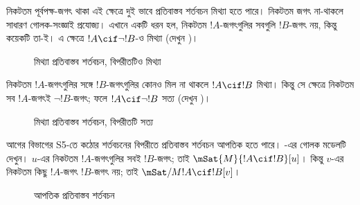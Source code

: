 \documentclass[../../../include/open-logic-section]{subfiles}
\begin{document}
নিকটতম পূর্বপক্ষ-জগৎ থাকা এই ক্ষেত্রে দুই ভাবে প্রতিবাস্তব
শর্তবচন মিথ্যা হতে পারে। নিকটতম জগৎ না-থাকলে সাধারণ
গোলক-সংজ্ঞাই প্রযোজ্য। এখানে একটি ধরন হল,
নিকটতম $!A$-জগৎগুলির সবগুলি $!B$-জগৎ নয়, কিন্তু কয়েকটি
তা-ই। এ ক্ষেত্রে $!A \cif \lnot !B$-ও মিথ্যা
(দেখুন )।
\begin{figure}
\begin{center}
\caption{মিথ্যা প্রতিবাস্তব শর্তবচন, বিপরীতটিও মিথ্যা}
\end{center}
\end{figure}
নিকটতম $!A$-জগৎগুলির সঙ্গে $!B$-জগৎগুলির কোনও মিল না
থাকলে $!A \cif !B$ মিথ্যা। কিন্তু সে ক্ষেত্রে নিকটতম সব
$!A$-জগৎই $\lnot !B$-জগৎ; ফলে $!A \cif \lnot !B$ সত্য
(দেখুন )।
\begin{figure}
\begin{center}
\caption{মিথ্যা প্রতিবাস্তব শর্তবচন, বিপরীতটি সত্য}
\end{center}
\end{figure}

আগের বিভাগের S5-তে কঠোর শর্তবচনের বিপরীতে প্রতিবাস্তব
শর্তবচন আপতিক হতে পারে।
-এর গোলক মডেলটি দেখুন। $u$-এর নিকটতম
$!A$-জগৎগুলির সবই $!B$-জগৎ; তাই $\mSat{M}{!A \cif
  !B}[u]$। কিন্তু $v$-এর নিকটতম কিছু $!A$-জগৎ
$!B$-জগৎ নয়; তাই $\mSat/{M}{!A \cif !B}[v]$।
\begin{figure}
\begin{center}
\end{center}
\caption{আপতিক প্রতিবাস্তব শর্তবচন}
\end{figure}
\end{document}

